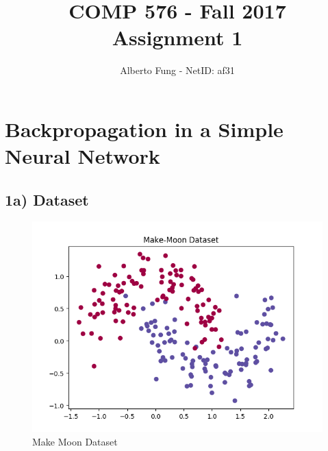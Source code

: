 \documentclass{article}
\title{COMP 576 - Fall 2017\\ Assignment 1}
\author{Alberto Fung - NetID: af31}
\begin{document}
\maketitle
{}

\section*{Backpropagation in a Simple Neural Network}

\subsection*{1a) Dataset}

	\begin{figure}[H]
		\centering
		\includegraphics[width=12cm]{figures/makemoondata.png}
		\caption{Make Moon Dataset}
	\end{figure}
\end{document}
